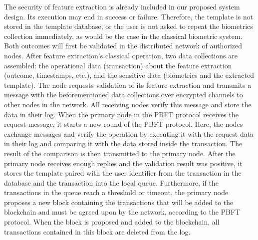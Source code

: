 The security of feature extraction is already included in our proposed system design. Its execution may end in success or failure. Therefore, the template is not stored in the template database, or the user is not asked to repeat the biometrics collection immediately, as would be the case in the classical biometric system. Both outcomes will first be validated in the distributed network of authorized nodes. After feature extraction's classical operation, two data collections are assembled: the operational data (transaction) about the feature extraction (outcome, timestamps, etc.), and the sensitive data (biometrics and the extracted template). The node requests validation of its feature extraction and transmits a message with the beforementioned data collections over encrypted channels to other nodes in the network. All receiving nodes verify this message and store the data in their log. When the primary node in the PBFT protocol receives the request message, it starts a new round of the PBFT protocol. Here, the nodes exchange messages and verify the operation by executing it with the request data in their log and comparing it with the data stored inside the transaction. The result of the comparison is then transmitted to the primary node. After the primary node receives enough replies and the validation result was positive, it stores the template paired with the user identifier from the transaction in the database and the transaction into the local queue. Furthermore, if the transactions in the queue reach a threshold or timeout, the primary node proposes a new block containing the transactions that will be added to the blockchain and must be agreed upon by the network, according to the PBFT protocol. When the block is proposed and added to the blockchain, all transactions contained in this block are deleted from the log.
